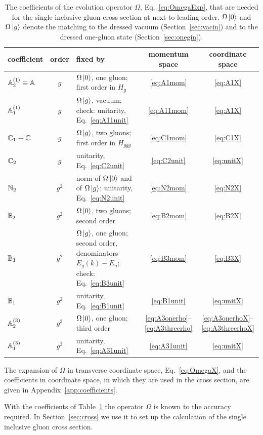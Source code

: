 \begin{table}[t]
\centering
\renewcommand{\arraystretch}{1.3}
\footnotesize\setlength{\tabcolsep}{4pt}
\begin{tabular}{@{}l c >{\raggedright\arraybackslash}p{} c c@{}}
\toprule
coefficient & order & fixed by & momentum space & coordinate space\\
\midrule
$\mathbb{A}^{(1)}_2\equiv\mathbb{A}$ & $g$ & $\Omega\ket0$, one gluon; first order in $H_g$ & \eqref{eq:A1mom} & \eqref{eq:A1X}\\
$\mathbb{A}^{(1)}_1$ & $g$ & $\Omega\ket g$, vacuum; check: unitarity, Eq.~\eqref{eq:A11unit} & \eqref{eq:A11mom} & \eqref{eq:A1X}\\
$\mathbb{C}_1\equiv\mathbb{C}$ & $g$ & $\Omega\ket g$, two gluons; first order in $H_{ggg}$ & \eqref{eq:C1mom} & \eqref{eq:C1X}\\
$\mathbb{C}_2$ & $g$ & unitarity, Eq.~\eqref{eq:C2unit} & \eqref{eq:C2unit} & \eqref{eq:unitX}\\
$\mathbb{N}_2$ & $g^2$ & norm of $\Omega\ket0$ and of $\Omega\ket g$; unitarity, Eq.~\eqref{eq:N2unit} & \eqref{eq:N2mom} & \eqref{eq:N2X}\\
$\mathbb{B}_2$ & $g^2$ & $\Omega\ket0$, two gluons; second order~\cite{Lublinsky:2016meo} & \eqref{eq:B2mom} & \eqref{eq:B2X}\\
$\mathbb{B}_3$ & $g^2$ & $\Omega\ket g$, one gluon; second order, denominators $E_g(k)-E_n$; check: Eq.~\eqref{eq:B3unit} & \eqref{eq:B3mom} & \eqref{eq:B3X}\\
$\mathbb{B}_1$ & $g^2$ & unitarity, Eq.~\eqref{eq:B1unit} & \eqref{eq:B1unit} & \eqref{eq:unitX}\\
$\mathbb{A}^{(3)}_2$ & $g^3$ & $\Omega\ket0$, one gluon; third order~\cite{Lublinsky:2016meo} & \eqref{eq:A3onerho}--\eqref{eq:A3threerho} & \eqref{eq:A3onerhoX}--\eqref{eq:A3threerhoX}\\
$\mathbb{A}^{(3)}_1$ & $g^3$ & unitarity, Eq.~\eqref{eq:A31unit} & \eqref{eq:A31unit} & \eqref{eq:unitX}\\
\bottomrule
\end{tabular}
\caption{The coefficients of the evolution operator $\Omega$, Eq.~\eqref{eq:OmegaExp}, that are needed for the single inclusive gluon cross section at next-to-leading order. $\Omega\ket0$ and $\Omega\ket g$ denote the matching to the dressed vacuum (Section~\ref{sec:vacin}) and to the dressed one-gluon state (Section~\ref{sec:onegin}).}
\label{tab:coeffs}
\end{table}

The expansion of $\Omega$ in transverse coordinate space, Eq.~\eqref{eq:OmegaX}, and the coefficients in coordinate space, in which they are used in the cross section, are given in Appendix~\ref{app:coefficients}.

With the coefficients of Table~\ref{tab:coeffs} the operator $\Omega$ is known to the accuracy required. In Section~\ref{sec:cross} we use it to set up the calculation of the single inclusive gluon cross section.
